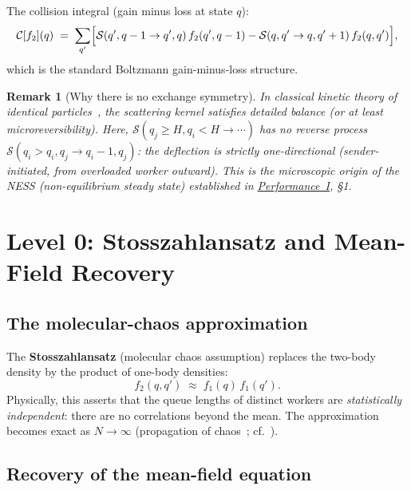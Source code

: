 \documentclass[11pt,a4paper]{report}
\newtheorem{remark}{Remark}[section]
\newcommand{\fone}{f_1}
\newcommand{\ftwo}{f_2}
\newcommand{\cC}{\mathcal{C}}
\newcommand{\cS}{\mathcal{S}}
\begin{document}
The collision integral (gain minus loss at state $q$):
\begin{equation}
  \cC[\ftwo](q)
  \;=\;
  \sum_{q'}\Bigl[
    \cS(q', q-1 \to q', q)\,\ftwo(q', q-1)
    -
    \cS(q, q' \to q, q'+1)\,\ftwo(q, q')
  \Bigr],
  \label{eq:collision}
\end{equation}
which is the standard Boltzmann gain-minus-loss structure.

\begin{remark}[Why there is no exchange symmetry]
In classical kinetic theory of identical particles~\cite{cercignani1988}, the scattering kernel
satisfies detailed balance (or at least microreversibility).
Here, $\cS(q_j \geq H, q_i < H \to \cdots)$ has \emph{no} reverse
process $\cS(q_i > q_i, q_j \to q_i - 1, q_j)$: the deflection is
strictly one-directional (sender-initiated, from overloaded worker outward).
This is the microscopic origin of the NESS (non-equilibrium steady state)
established in \hyperref[chap:load_balance]{Performance~I}, \S{}1.
\end{remark}

\section{Level 0: Stosszahlansatz and Mean-Field Recovery}

\subsection{The molecular-chaos approximation}

The \textbf{Stosszahlansatz} (molecular chaos assumption) replaces the
two-body density by the product of one-body densities:
\begin{equation}
  \ftwo(q, q') \;\approx\; \fone(q)\,\fone(q').
  \label{eq:mf-factorization}
\end{equation}
Physically, this asserts that the queue lengths of distinct workers are
\emph{statistically independent}: there are no correlations beyond the
mean.  The approximation becomes exact as $N \to \infty$
(propagation of chaos~\cite{mckean1967,sznitman1991}; cf.\ \cite{kac1956}).

\subsection{Recovery of the mean-field equation}
\end{document}
